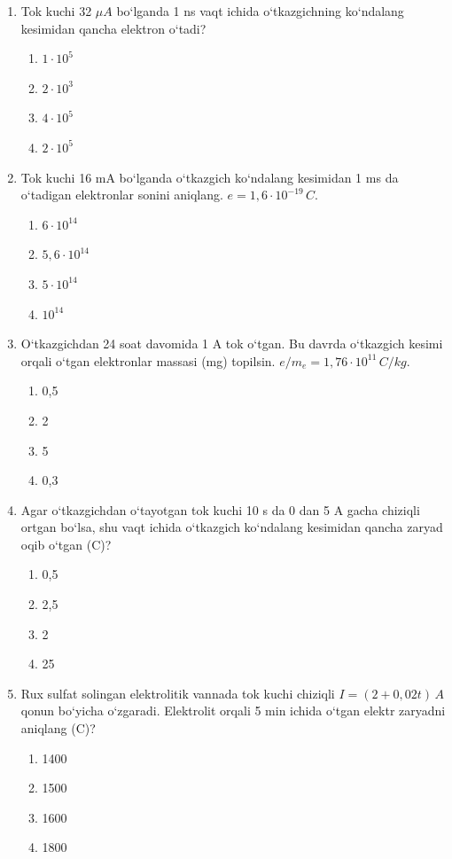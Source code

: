 \begin{enumerate}
\item Tok kuchi 32 $\mu A$ bo‘lganda 1 ns vaqt ichida o‘tkazgichning ko‘ndalang kesimidan qancha elektron o‘tadi?
\begin{enumerate}[label=\Alph*)]
\item $1 \cdot 10^5$
\item $2 \cdot 10^3$
\item $4 \cdot 10^5$
\item $2 \cdot 10^5$
\end{enumerate}

\item Tok kuchi 16 mA bo‘lganda o‘tkazgich ko‘ndalang kesimidan 1 ms da o‘tadigan elektronlar sonini aniqlang. $e = 1,6 \cdot 10^{-19} \, C$.
\begin{enumerate}[label=\Alph*)]
\item $6 \cdot 10^{14}$
\item $5,6 \cdot 10^{14}$
\item $5 \cdot 10^{14}$
\item $10^{14}$
\end{enumerate}

\item O‘tkazgichdan 24 soat davomida 1 A tok o‘tgan. Bu davrda o‘tkazgich kesimi orqali o‘tgan elektronlar massasi (mg) topilsin. $e/m_e = 1,76 \cdot 10^{11} \, C/kg$.
\begin{enumerate}[label=\Alph*)]
\item 0,5
\item 2
\item 5
\item 0,3
\end{enumerate}

\item Agar o‘tkazgichdan o‘tayotgan tok kuchi 10 s da 0 dan 5 A gacha chiziqli ortgan bo‘lsa, shu vaqt ichida o‘tkazgich ko‘ndalang kesimidan qancha zaryad oqib o‘tgan (C)?
\begin{enumerate}[label=\Alph*)]
\item 0,5
\item 2,5
\item 2
\item 25
\end{enumerate}

\item Rux sulfat solingan elektrolitik vannada tok kuchi chiziqli $I = (2 + 0,02t) \, A$ qonun bo‘yicha o‘zgaradi. Elektrolit orqali 5 min ichida o‘tgan elektr zaryadni aniqlang (C)?
\begin{enumerate}[label=\Alph*)]
\item 1400
\item 1500
\item 1600
\item 1800
\end{enumerate}


\end{enumerate}
